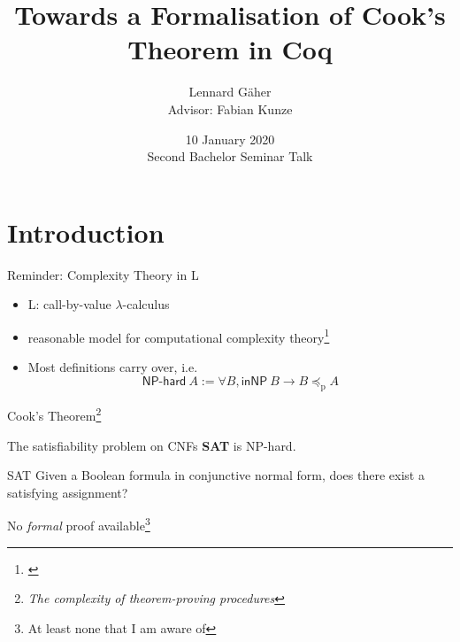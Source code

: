 \documentclass[11pt,usenames,dvipsnames,
hyperref={pdfencoding=auto,psdextra}]{beamer}
\title{Towards a Formalisation of Cook's Theorem in Coq}
\institute{Saarland University}
\date{10 January 2020\\[1ex]Second Bachelor Seminar Talk}
\author{Lennard Gäher\\[1mm] {\small{Advisor: Fabian Kunze}}}
\let\otp\titlepage
\renewcommand{\titlepage}{\otp\addtocounter{framenumber}{-1}}
\newcommand*{\sat}{\textbf{SAT}}
\begin{document}
\begin{frame}[plain]
  \titlepage
\end{frame}

\section{Introduction}

\begin{frame}{Reminder: Complexity Theory in L}
  \begin{itemize}
    \item L: call-by-value $\lambda$-calculus
    \item reasonable model for computational complexity theory\footnote{\cite{ForsterKunzeRoth:2019:wcbv-Reasonable}}
    \item Most definitions carry over, i.e. 
      \[
        \textsf{NP-hard}~A := \forall B, \textsf{inNP}~B \rightarrow B \preceq_{\text{p}} A 
      \]
  \end{itemize}
\end{frame}

\begin{frame}{Cook's Theorem\footnote{\emph{The complexity of theorem-proving procedures}\cite{Cook:1971:CTP:800157.805047}}}

  \begin{block}{\vspace*{-3ex}}
    The satisfiability problem on CNFs \sat{} is NP-hard.
  \end{block}
  \vspace{3ex}
  \begin{block}{SAT}
    Given a Boolean formula in conjunctive normal form, does there exist a satisfying assignment?
  \end{block}

  \vspace{3ex}
  \begin{center}
    No \emph{formal} proof available\footnote{At least none that I am aware of}
  \end{center}
\end{frame}
\end{document}
